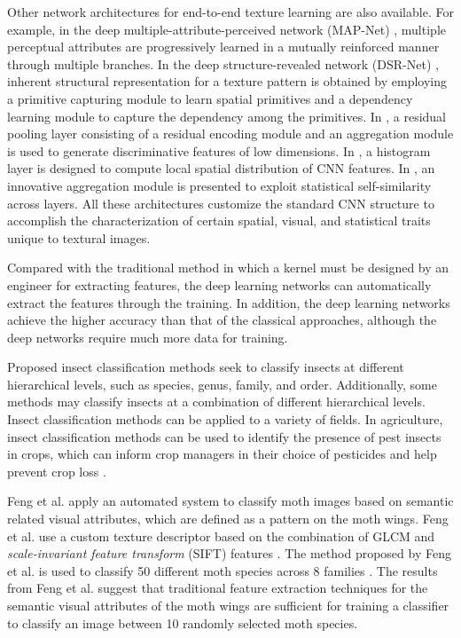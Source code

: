 \documentclass{aci}
\numberwithin{equation}{section}
\begin{document}
Other network architectures for end-to-end texture learning are also available.
For example, in the deep multiple-attribute-perceived network (MAP-Net)
\cite{zhai_deep_2019}, multiple perceptual attributes are progressively learned
in a mutually reinforced manner through multiple branches. In the deep
structure-revealed network (DSR-Net) \cite{zhai_deep_2020}, inherent structural
representation for a texture pattern is obtained by employing a primitive
capturing module to learn spatial primitives and a dependency learning module to
capture the dependency among the primitives. In \cite{mao_deep_2021}, a residual
pooling layer consisting of a residual encoding module and an aggregation module
is used to generate discriminative features of low dimensions. In
\cite{peeples_histogram_2021}, a histogram layer is designed to compute local
spatial distribution of CNN features. In \cite{chen_deep_2021}, an innovative
aggregation module is presented to exploit statistical self-similarity across
layers. All these architectures customize the standard CNN structure to
accomplish the characterization of certain spatial, visual, and statistical
traits unique to textural images.

Compared with the traditional method in which a kernel must be designed by an
engineer for extracting features, the deep learning networks can automatically
extract the features through the training. In addition, the deep learning
networks achieve the higher accuracy than that of the classical approaches,
although the deep networks require much more data for training.


Proposed insect classification methods seek to classify insects at different
hierarchical levels, such as species, genus, family, and order. Additionally,
some methods may classify insects at a combination of different hierarchical
levels. Insect classification methods can be applied to a variety of fields. In
agriculture, insect classification methods can be used to identify the presence
of pest insects in crops, which can inform crop managers in their choice of
pesticides and help prevent crop loss \cite{liu_pestnet_2019,
    kasinathan_machine_2021}.

Feng et al. \cite{feng_automated_2013} apply an automated system to classify
moth images based on semantic related visual attributes, which are defined as a
pattern on the moth wings. Feng et al. \cite{feng_automated_2013} use a custom
texture descriptor based on the combination of GLCM and \textit{scale-invariant
    feature transform} (SIFT) features \cite{gotlieb_texture_1990,
    lowe_distinctive_2004}. The method proposed by Feng et al.
\cite{feng_automated_2013} is used to classify 50 different moth species across
8 families \cite{feng_automated_2013}. The results from Feng et al.
\cite{feng_automated_2013} suggest that traditional feature extraction
techniques for the semantic visual attributes of the moth wings are sufficient
for training a classifier to classify an image between 10 randomly selected moth
species.
\end{document}
